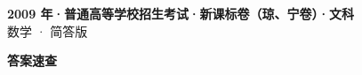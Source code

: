 \documentclass[zihao=-4, a4paper]{ctexart}
\begin{document}
\begin{center}
  {\Large\bfseries 2009 年·普通高等学校招生考试·新课标卷（琼、宁卷）·文科}\\[4pt]
  {\large 数学 · 简答版}
\end{center}
\medskip
{}

\clearpage
{}
\begin{center}{\Large\bfseries 答案速查}\end{center}
\medskip

\end{document}
